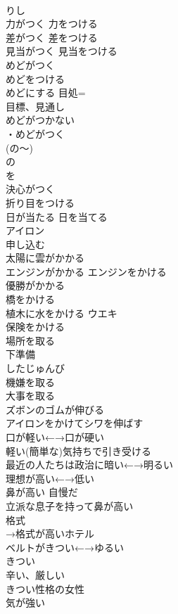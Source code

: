 \documentclass[8pt]{extreport}
\begin{document}
\begin{CJK}{UTF8}{min}
\\	りし
\\	力がつく 力をつける	
\\	差がつく 差をつける	
\\	見当がつく 見当をつける	
\\	めどがつく 
\\	めどをつける 
\\	めどにする	目処=
\\	目標、見通し 
\\	めどがつかない　
\\	・めどがつく 
\\	(の～) 
\\	の 
\\	を
\\	決心がつく	
\\	折り目をつける	
\\	日が当たる 日を当てる	
\\	アイロン	
\\	申し込む	
\\	太陽に雲がかかる	
\\	エンジンがかかる エンジンをかける	
\\	優勝がかかる	
\\	橋をかける	
\\	植木に水をかける	ウエキ 
\\	保険をかける	
\\	場所を取る	
\\	下準備	
\\	したじゅんび
\\	機嫌を取る	
\\	大事を取る	
\\	ズボンのゴムが伸びる	
\\	アイロンをかけてシワを伸ばす	
\\	口が軽い←→口が硬い	
\\	軽い(簡単な)気持ちで引き受ける	
\\	最近の人たちは政治に暗い←→明るい	
\\	理想が高い←→低い	
\\	鼻が高い	自慢だ 
\\	立派な息子を持って鼻が高い 
\\	格式	
\\	→格式が高いホテル
\\	ベルトがきつい←→ゆるい	
\\	きつい
\\	辛い、厳しい	
\\	きつい性格の女性	
\\	気が強い

\end{CJK}
\end{document}
